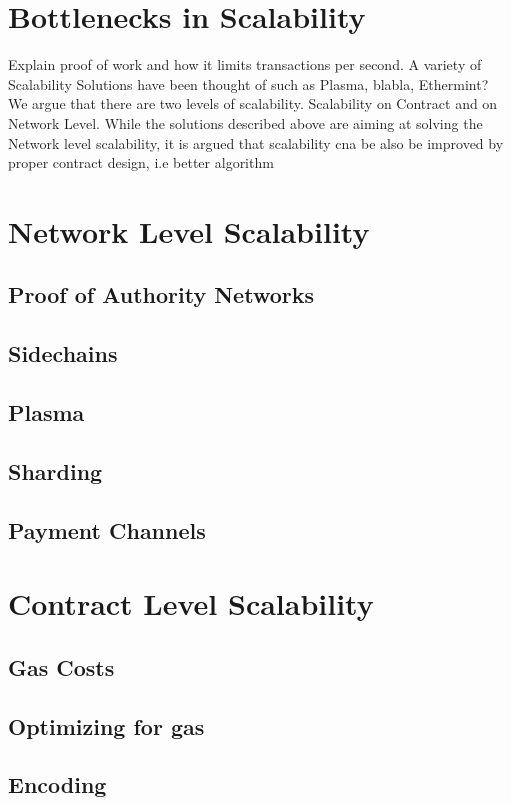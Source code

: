 \section{Bottlenecks in Scalability}
Explain proof of work and how it limits transactions per second.
A variety of Scalability Solutions have been thought of such as Plasma, blabla, Ethermint?
We argue that there are two levels of scalability. Scalability on Contract and on Network Level. While the solutions described above are aiming at solving the Network level scalability, it is argued that scalability cna be also be improved by proper contract design, i.e better algorithm

\section{Network Level Scalability}
\subsection{Proof of Authority Networks}
\subsection{Sidechains}
\subsection{Plasma}
\subsection{Sharding}
\subsection{Payment Channels}

\section{Contract Level Scalability}
\subsection{Gas Costs}
\subsection{Optimizing for gas}
\subsection{Encoding}